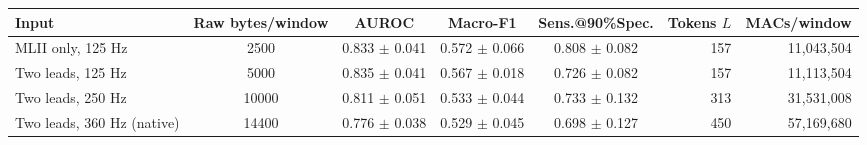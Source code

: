 \begin{tabular}{lccccrr}
\toprule
Input & Raw bytes/window & AUROC & Macro-F1 & Sens.@90\%Spec. & Tokens $L$ & MACs/window \\
\midrule
MLII only, 125 Hz & 2500 & 0.833 $\pm$ 0.041 & 0.572 $\pm$ 0.066 & 0.808 $\pm$ 0.082 & 157 & 11,043,504 \\
Two leads, 125 Hz & 5000 & 0.835 $\pm$ 0.041 & 0.567 $\pm$ 0.018 & 0.726 $\pm$ 0.082 & 157 & 11,113,504 \\
Two leads, 250 Hz & 10000 & 0.811 $\pm$ 0.051 & 0.533 $\pm$ 0.044 & 0.733 $\pm$ 0.132 & 313 & 31,531,008 \\
Two leads, 360 Hz (native) & 14400 & 0.776 $\pm$ 0.038 & 0.529 $\pm$ 0.045 & 0.698 $\pm$ 0.127 & 450 & 57,169,680 \\
\bottomrule
\end{tabular}
